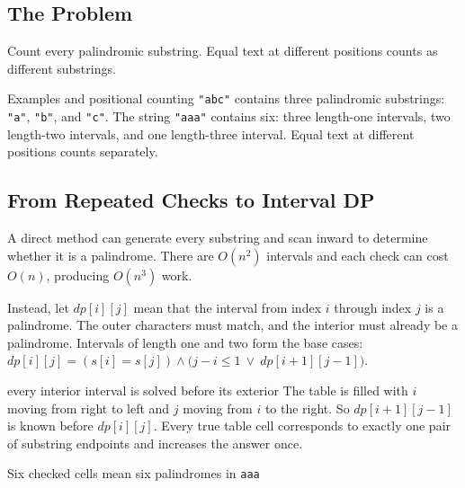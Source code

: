 
\subsection{The Problem}
Count every palindromic substring. Equal text at different positions counts
as different substrings.

\begin{conceptbox}{Examples and positional counting}
\texttt{"abc"} contains three palindromic substrings: \texttt{"a"},
\texttt{"b"}, and \texttt{"c"}. The string \texttt{"aaa"} contains six:
three length-one intervals, two length-two intervals, and one length-three
interval. Equal text at different positions counts separately.
\end{conceptbox}

\subsection{From Repeated Checks to Interval DP}
A direct method can generate every substring and scan inward to determine
whether it is a palindrome. There are \(O(n^2)\) intervals and each check can
cost \(O(n)\), producing \(O(n^3)\) work.

Instead, let \(dp[i][j]\) mean that the interval from index \(i\) through
index \(j\) is a palindrome. The outer characters must match, and the interior
must already be a palindrome. Intervals of length one and two form the base
cases: \(dp[i][j]=(s[i]=s[j])\land\bigl(j-i\le1\ \lor\ dp[i+1][j-1]\bigr).\)

\begin{invariantbox}{every interior interval is solved before its exterior}
The table is filled with \(i\) moving from right to left and \(j\) moving from
\(i\) to the right. So \(dp[i+1][j-1]\) is known before
\(dp[i][j]\). Every true table cell corresponds to exactly one pair of
substring endpoints and increases the answer once.
\end{invariantbox}

\begin{visualbox}{Six checked cells mean six palindromes in \texttt{aaa}}
\centering
{}
\end{visualbox}

